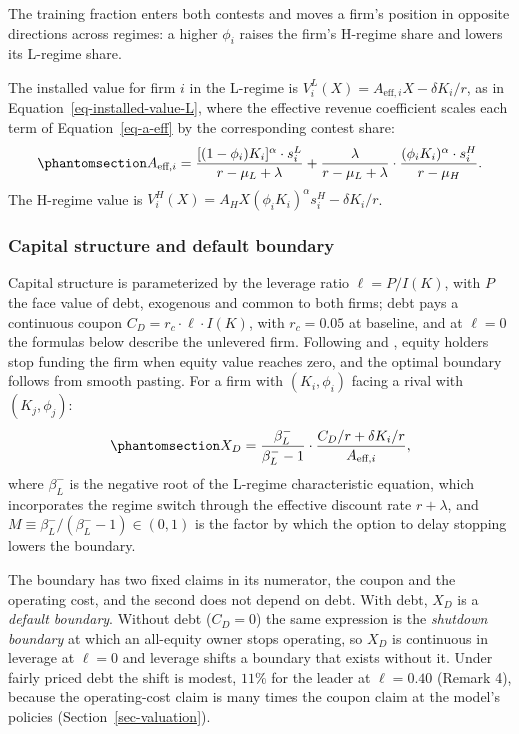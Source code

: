 \documentclass[
  11pt,
  letterpaper,
]{scrartcl}
\begin{document}
The training fraction enters both contests and moves a firm's position
in opposite directions across regimes: a higher \(\phi_i\) raises the
firm's H-regime share and lowers its L-regime share.

The installed value for firm \(i\) in the L-regime is
\(V_i^L(X) = A_{\text{eff},i} X - \delta K_i/r\), as in
Equation~\ref{eq-installed-value-L}, where the effective revenue
coefficient scales each term of Equation~\ref{eq-a-eff} by the
corresponding contest share:
\begin{equation}\protect\phantomsection\label{eq-a-eff-duopoly}{
A_{\text{eff},i} = \frac{[(1-\phi_i)K_i]^\alpha \cdot s_i^L}{r - \mu_L + \lambda} + \frac{\lambda}{r - \mu_L + \lambda} \cdot \frac{(\phi_i K_i)^\alpha \cdot s_i^H}{r - \mu_H}.
}\end{equation} The H-regime value is
\(V_i^H(X) = A_H X (\phi_i K_i)^\alpha s_i^H - \delta K_i/r\).

\subsubsection{Capital structure and default
boundary}\label{capital-structure-and-default-boundary}

Capital structure is parameterized by the leverage ratio
\(\ell = P / I(K)\), with \(P\) the face value of debt, exogenous and
common to both firms; debt pays a continuous coupon
\(C_D = r_c \cdot \ell \cdot I(K)\), with \(r_c = 0.05\) at baseline,
and at \(\ell = 0\) the formulas below describe the unlevered firm.
Following \citet{leland1994corporate} and \citet{leland1996optimal},
equity holders stop funding the firm when equity value reaches zero, and
the optimal boundary follows from smooth pasting. For a firm with
\((K_i, \phi_i)\) facing a rival with \((K_j, \phi_j)\):
\begin{equation}\protect\phantomsection\label{eq-default-boundary}{
X_D = \frac{\beta_L^-}{\beta_L^- - 1} \cdot \frac{C_D / r + \delta K_i / r}{A_{\text{eff},i}},
}\end{equation} where \(\beta_L^-\) is the negative root of the L-regime
characteristic equation, which incorporates the regime switch through
the effective discount rate \(r + \lambda\), and
\(M \equiv \beta_L^-/(\beta_L^- - 1) \in (0,1)\) is the factor by which
the option to delay stopping lowers the boundary.

The boundary has two fixed claims in its numerator, the coupon and the
operating cost, and the second does not depend on debt. With debt,
\(X_D\) is a \emph{default boundary}. Without debt (\(C_D = 0\)) the
same expression is the \emph{shutdown boundary} at which an all-equity
owner stops operating, so \(X_D\) is continuous in leverage at
\(\ell = 0\) and leverage shifts a boundary that exists without it.
Under fairly priced debt the shift is modest, \(11\%\) for the leader at
\(\ell = 0.40\) (Remark 4), because the operating-cost claim is many
times the coupon claim at the model's policies
(Section~\ref{sec-valuation}).
\end{document}
